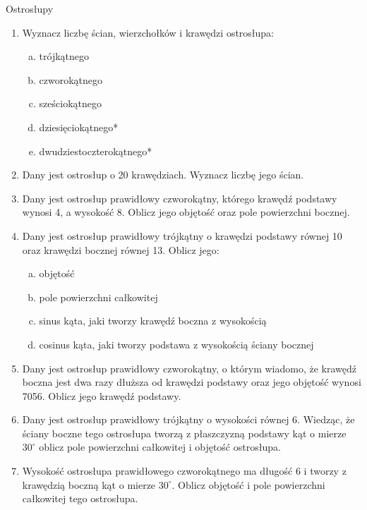 \documentclass[12pt,a4paper]{article}
\begin{document}
	\newpage
	\begin{center}
		\large Ostrosłupy
	\end{center}
	\begin{enumerate}[1.]
	\item Wyznacz liczbę ścian, wierzchołków i krawędzi ostrosłupa:
	\begin{enumerate}[a)]
		\item trójkątnego
		\item czworokątnego
		\item sześciokątnego
		\item dziesięciokątnego*
		\item dwudziestoczterokątnego*
	\end{enumerate}
	
	\item Dany jest ostrosłup o 20 krawędziach. Wyznacz liczbę jego ścian.

	\item Dany jest ostrosłup prawidłowy czworokątny, którego krawędź podstawy wynosi 4, a wysokość 8. Oblicz jego objętość oraz pole powierzchni bocznej.
	
	\item Dany jest ostrosłup prawidłowy trójkątny o krawędzi podstawy równej 10 oraz krawędzi bocznej równej 13. Oblicz jego:
	\begin{enumerate}[a)]
		\item objętość
		\item pole powierzchni całkowitej
		\item sinus kąta, jaki tworzy krawędź boczna z wysokością
		\item cosinus kąta, jaki tworzy podstawa z wysokością ściany bocznej
	\end{enumerate}

	\item Dany jest ostrosłup prawidłowy czworokątny, o którym wiadomo, że krawędź boczna jest dwa razy dłuższa od krawędzi podstawy oraz jego objętość wynosi 7056. Oblicz jego krawędź podstawy.

	\item Dany jest ostrosłup prawidłowy trójkątny o wysokości równej 6. Wiedząc, że ściany boczne tego ostrosłupa tworzą z płaszczyzną podstawy kąt o mierze $30^\circ$ oblicz pole powierzchni całkowitej i objętość ostrosłupa.

	\item Wysokość ostrosłupa prawidłowego czworokątnego ma długość 6 i tworzy z krawędzią boczną kąt o mierze $30^\circ$. Oblicz objętość i pole powierzchni całkowitej tego ostrosłupa.


\end{enumerate}
\end{document}
